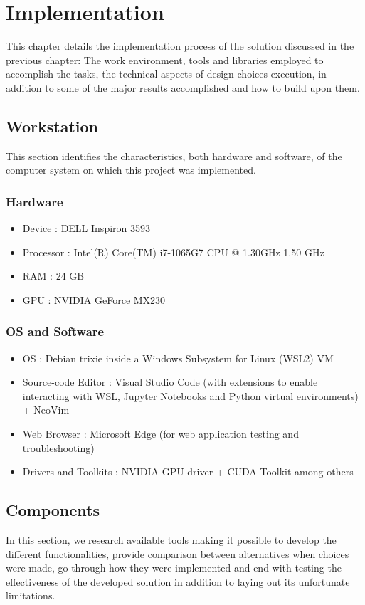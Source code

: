 \chapter{Implementation}
This chapter details the implementation process of the solution discussed in the previous chapter: The work environment, tools and libraries employed to accomplish the tasks, the technical aspects of design choices execution, in addition to some of the major results accomplished and how to build upon them.
\newpage

\section{Workstation}
This section identifies the characteristics, both hardware and software, of the computer system on which this project was implemented.
\bigskip
\subsection{Hardware}
\smallskip
\begin{itemize}
    \item Device : DELL Inspiron 3593
    \item Processor : Intel(R) Core(TM) i7-1065G7 CPU @ 1.30GHz   1.50 GHz
    \item RAM : 24 GB
    \item GPU : NVIDIA GeForce MX230
\end{itemize}
\medskip
\subsection{OS and Software}
\smallskip
\begin{itemize}
    \item OS : Debian trixie inside a Windows Subsystem for Linux (WSL2) VM
    \item Source-code Editor : Visual Studio Code (with extensions to enable interacting with WSL, Jupyter Notebooks and Python virtual environments) + NeoVim
    \item Web Browser : Microsoft Edge (for web application testing and troubleshooting)
    \item Drivers and Toolkits : NVIDIA GPU driver + CUDA Toolkit among others
\end{itemize}
\newpage

\section{Components}
In this section, we research available tools making it possible to develop the different functionalities, provide comparison between alternatives when choices were made, go through how they were implemented and end with testing the effectiveness of the developed solution in addition to laying out its unfortunate limitations.

